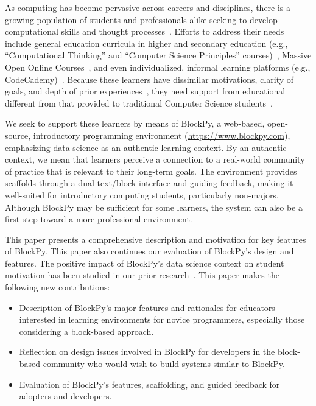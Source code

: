 \documentclass[10pt,journal,compsoc]{IEEEtran}
\begin{document}
As computing has become pervasive across careers and disciplines, there is a growing population of students and professionals alike seeking to develop computational skills and thought processes~\cite{wing2014computational}.
Efforts to address their needs include general education curricula in higher and secondary education (e.g., ``Computational Thinking'' and ``Computer Science Principles'' courses)~\cite{wing2014computational, davis2013computer}, Massive Open Online Courses~\cite{jordan2014initial}, and even individualized, informal learning platforms (e.g., CodeCademy)~\cite{wortham2012surge}.
Because these learners have dissimilar motivations, clarity of goals, and depth of prior experiences~\cite{forte2005motivation, chilana2015perceptions}, they need support from educational different from that provided to traditional Computer Science students~\cite{goldweber2013framework,gothic-novels}.

We seek to support these learners by means of BlockPy, a web-based, open-source, introductory programming environment (\url{https://www.blockpy.com}), emphasizing data science as an authentic learning context.
By an authentic context, we mean that learners perceive a connection to a real-world community of practice that is relevant to their long-term goals.
The environment provides scaffolds through a dual text/block interface and guiding feedback, making it well-suited for introductory computing students, particularly non-majors.
Although BlockPy may be sufficient for some learners, the system can also be a first step toward a more professional environment.

This paper presents a comprehensive description and motivation for key features of BlockPy.
This paper also continues our evaluation of BlockPy's design and features.
The positive impact of BlockPy's data science context on student motivation has been studied in our prior research~\cite{corgis2017}.
This paper makes the following new contributions:

\begin{itemize}
\item Description of BlockPy's major features and rationales for educators interested in learning environments for novice programmers, especially those considering a block-based approach.
\item Reflection on design issues involved in BlockPy for developers in the block-based community who would wish to build systems similar to BlockPy.
\item Evaluation of BlockPy's features, scaffolding, and guided feedback for adopters and developers.
\end{itemize}
\end{document}
